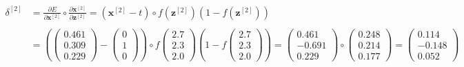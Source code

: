 \documentclass[12pt]{article}
\begin{document}
\begin{enumerate}
\begin{equation*}
    \begin{aligned}
        \delta^{[2]} &= \frac{\partial E}{\partial \mathbf{x}^{[2]}} \circ \frac{\partial \mathbf{x}^{[2]}}{\partial \mathbf{z}^{[2]}} = (\mathbf{x}^{[2]} - t) \circ f(\mathbf{z}^{[2]})(1 - f(\mathbf{z}^{[2]}))\\
        \\
        &=\left( \begin{pmatrix} 
            0.461 \\
            0.309 \\
            0.229
            \end{pmatrix} -
            \begin{pmatrix} 
            0\\     
            1\\
            0 
            \end{pmatrix} \right)
            \circ f\begin{pmatrix}
            2.7 \\
            2.3 \\
            2.0 
            \end{pmatrix}
            \left(1 - f\begin{pmatrix}
            2.7 \\
            2.3 \\
            2.0
            \end{pmatrix}\right) = \begin{pmatrix}
            0.461 \\
            -0.691 \\
            0.229
            \end{pmatrix} \circ \begin{pmatrix}
            0.248 \\
            0.214 \\
            0.177
            \end{pmatrix} = \begin{pmatrix}
            0.114 \\
            -0.148 \\
            0.052
            \end{pmatrix}
    \end{aligned}
\end{equation*}


\end{enumerate}
\end{document}
